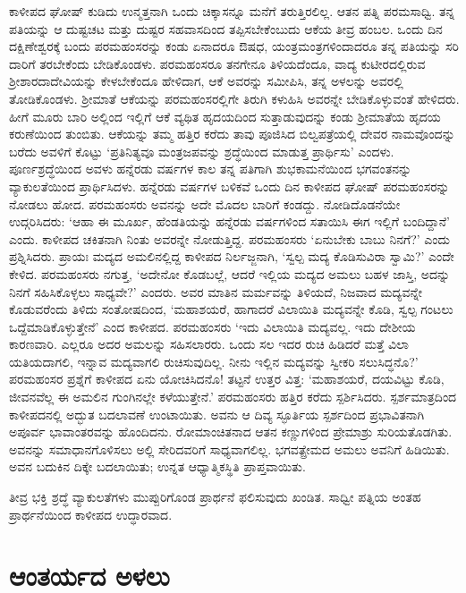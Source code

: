 ಕಾಳೀಪದ ಘೋಷ್ ಕುಡಿದು ಉನ್ಮತ್ತನಾಗಿ ಒಂದು ಚಿಕ್ಕಾಸನ್ನೂ ಮನೆಗೆ ತರುತ್ತಿರಲಿಲ್ಲ. ಆತನ ಪತ್ನಿ ಪರಮಸಾಧ್ವಿ. ತನ್ನ ಪತಿಯನ್ನು ಆ ದುಷ್ಟಚಟ ಮತ್ತು ದುಷ್ಟರ ಸಹವಾಸದಿಂದ ತಪ್ಪಿಸಬೇಕೆಂಬುದು ಆಕೆಯ ತೀವ್ರ ಹಂಬಲ. ಒಂದು ದಿನ ದಕ್ಷಿಣೇಶ್ವರಕ್ಕೆ ಬಂದು ಪರಮಹಂಸರನ್ನು ಕಂಡು ಏನಾದರೂ ಔಷಧ, ಯಂತ್ರಮಂತ್ರಗಳಿಂದಾದರೂ ತನ್ನ ಪತಿಯನ್ನು ಸರಿ ದಾರಿಗೆ ತರಬೇಕೆಂದು ಬೇಡಿಕೊಂಡಳು. ಪರಮಹಂಸರೂ ತನಗೇನೂ ತಿಳಿಯದೆಂದೂ, ವಾದ್ಯ ಕುಟೀರದಲ್ಲಿರುವ ಶ‍್ರೀಶಾರದಾದೇವಿಯನ್ನು ಕೇಳಬೇಕೆಂದೂ ಹೇಳಿದಾಗ, ಆಕೆ ಅವರನ್ನು ಸಮೀಪಿಸಿ, ತನ್ನ ಅಳಲನ್ನು ಅವರಲ್ಲಿ ತೋಡಿಕೊಂಡಳು. ಶ‍್ರೀಮಾತೆ ಆಕೆಯನ್ನು ಪರಮಹಂಸರಲ್ಲಿಗೇ ತಿರುಗಿ ಕಳುಹಿಸಿ ಅವರನ್ನೇ ಬೇಡಿಕೊಳ್ಳುವಂತೆ ಹೇಳಿದರು. ಹೀಗೆ ಮೂರು ಬಾರಿ ಅಲ್ಲಿಂದ ಇಲ್ಲಿಗೆ ಆಕೆ ವ್ಯಥಿತ ಹೃದಯದಿಂದ ಸುತ್ತಾಡುವುದನ್ನು ಕಂಡು ಶ‍್ರೀಮಾತೆಯ ಹೃದಯ ಕರುಣೆಯಿಂದ ತುಂಬಿತು. ಆಕೆಯನ್ನು ತಮ್ಮ ಹತ್ತಿರ ಕರೆದು ತಾವು ಪೂಜಿಸಿದ ಬಿಲ್ವಪತ್ರೆಯಲ್ಲಿ ದೇವರ ನಾಮವೊಂದನ್ನು ಬರೆದು ಅವಳಿಗೆ ಕೊಟ್ಟು ‘ಪ್ರತಿನಿತ್ಯವೂ ಮಂತ್ರಜಪವನ್ನು ಶ್ರದ್ಧೆಯಿಂದ ಮಾಡುತ್ತ ಪ್ರಾರ್ಥಿಸು’ ಎಂದಳು. ಪೂರ್ಣಶ್ರದ್ಧೆಯಿಂದ ಅವಳು ಹನ್ನೆರಡು ವರ್ಷಗಳ ಕಾಲ ತನ್ನ ಪತಿಗಾಗಿ ಶುಭಕಾಮನೆಯಿಂದ ಭಗವಂತನನ್ನು ವ್ಯಾಕುಲತೆಯಿಂದ ಪ್ರಾರ್ಥಿಸಿದಳು. ಹನ್ನೆರಡು ವರ್ಷಗಳ ಬಳಿಕವೆ ಒಂದು ದಿನ ಕಾಳೀಪದ ಘೋಷ್ ಪರಮಹಂಸರನ್ನು ನೋಡಲು ಹೋದ. ಪರಮಹಂಸರು ಅವನನ್ನು ಅದೇ ಮೊದಲ ಬಾರಿಗೆ ಕಂಡದ್ದು. ನೋಡಿದೊಡನೆಯೇ ಉದ್ಗರಿಸಿದರು: ‘ಆಹಾ ಈ ಮೂರ್ಖ, ಹೆಂಡತಿಯನ್ನು ಹನ್ನೆರಡು ವರ್ಷಗಳಿಂದ ಸತಾಯಿಸಿ ಈಗ ಇಲ್ಲಿಗೆ ಬಂದಿದ್ದಾನೆ’ ಎಂದು. ಕಾಳೀಪದ ಚಕಿತನಾಗಿ ನಿಂತು ಅವರನ್ನೇ ನೋಡುತ್ತಿದ್ದ. ಪರಮಹಂಸರು ‘ಏನುಬೇಕು ಬಾಬು ನಿನಗೆ?’ ಎಂದು ಪ್ರಶ್ನಿಸಿದರು. ಪ್ರಾಯಃ ಮದ್ಯದ ಅಮಲಿನಲ್ಲಿದ್ದ ಕಾಳೀಪದ ನಿರ್ಲಜ್ಜನಾಗಿ, ‘ಸ್ವಲ್ಪ ಮದ್ಯ ಕೊಡಿಸುವಿರಾ ಸ್ವಾಮಿ?’ ಎಂದೇ ಕೇಳಿದ. ಪರಮಹಂಸರು ನಗುತ್ತ, ‘ಅದೇನೋ ಕೊಡಬಲ್ಲೆ, ಆದರೆ ಇಲ್ಲಿಯ ಮದ್ಯದ ಅಮಲು ಬಹಳ ಜಾಸ್ತಿ, ಅದನ್ನು ನಿನಗೆ ಸಹಿಸಿಕೊಳ್ಳಲು ಸಾಧ್ಯವೇ?’ ಎಂದರು. ಅವರ ಮಾತಿನ ಮರ್ಮವನ್ನು ತಿಳಿಯದೆ, ನಿಜವಾದ ಮದ್ಯವನ್ನೇ ಕೊಡುವರೆಂದು ತಿಳಿದು ಸಂತೋಷದಿಂದ, ‘ಮಹಾಶಯರೆ, ಹಾಗಾದರೆ ವಿಲಾಯಿತಿ ಮದ್ಯವನ್ನೇ ಕೊಡಿ, ಸ್ವಲ್ಪ ಗಂಟಲು ಒದ್ದೆಮಾಡಿಕೊಳ್ಳುತ್ತೇನೆ’ ಎಂದ ಕಾಳೀಪದ. ಪರಮಹಂಸರು ‘ಇದು ವಿಲಾಯಿತಿ ಮದ್ಯವಲ್ಲ. ಇದು ದೇಶೀಯ ಕಾರಣವಾರಿ. ಎಲ್ಲರೂ ಅದರ ಅಮಲನ್ನು ಸಹಿಸಲಾರರು. ಒಂದು ಸಲ ಇದರ ರುಚಿ ಹಿಡಿದರೆ ಮತ್ತೆ ವಿಲಾ ಯತಿಯದಾಗಲಿ, ಇನ್ನಾವ ಮದ್ಯವಾಗಲಿ ರುಚಿಸುವುದಿಲ್ಲ. ನೀನು ಇಲ್ಲಿನ ಮದ್ಯವನ್ನು ಸ್ವೀಕರಿ ಸಲುಸಿದ್ಧನೊ?’ ಪರಮಹಂಸರ ಪ್ರಶ್ನೆಗೆ ಕಾಳೀಪದ ಏನು ಯೋಚಿಸಿದನೊ! ತಟ್ಟನೆ ಉತ್ತರ ವಿತ್ತ: ‘ಮಹಾಶಯರೆ, ದಯವಿಟ್ಟು ಕೊಡಿ, ಜೀವನವೆಲ್ಲ ಈ ಅಮಲಿನ ಗುಂಗಿನಲ್ಲೇ ಕಳೆಯುತ್ತೇನೆ.’ ಪರಮಹಂಸರು ಹತ್ತಿರ ಕರೆದು ಸ್ಪರ್ಶಿಸಿದರು. ಸ್ಪರ್ಶಮಾತ್ರದಿಂದ ಕಾಳೀಪದನಲ್ಲಿ ಅದ್ಭುತ ಬದಲಾವಣೆ ಉಂಟಾಯಿತು. ಅವನು ಆ ದಿವ್ಯ ಸ್ಫೂರ್ತಿಯ ಸ್ಪರ್ಶದಿಂದ ಪ್ರಭಾವಿತನಾಗಿ ಅಪೂರ್ವ ಭಾವಾಂತರವನ್ನು ಹೊಂದಿದನು. ರೋಮಾಂಚಿತನಾದ ಆತನ ಕಣ್ಣುಗಳಿಂದ ಪ್ರೇಮಾಶ್ರು ಸುರಿಯತೊಡಗಿತು. ಅವನನ್ನು ಸಮಾಧಾನಗೊಳಿಸಲು ಅಲ್ಲಿ ಸೇರಿದವರಿಗೆ ಸಾಧ್ಯವಾಗಲಿಲ್ಲ. ಭಗವತ್ಪ್ರೇಮದ ಅಮಲು ಅವನಿಗೆ ಹಿಡಿಯಿತು. ಅವನ ಬದುಕಿನ ದಿಕ್ಕೇ ಬದಲಾಯಿತು; ಉನ್ನತ ಆಧ್ಯಾತ್ಮಿಕಸ್ಥಿತಿ ಪ್ರಾಪ್ತ\-ವಾಯಿತು.

ತೀವ್ರ ಭಕ್ತಿ ಶ್ರದ್ಧೆ ವ್ಯಾಕುಲತೆಗಳು ಮುಪ್ಪುರಿಗೊಂಡ ಪ್ರಾರ್ಥನೆ ಫಲಿಸುವುದು ಖಂಡಿತ. ಸಾಧ್ವೀ ಪತ್ನಿಯ ಅಂತಹ ಪ್ರಾರ್ಥನೆಯಿಂದ ಕಾಳೀಪದ ಉದ್ಧಾರವಾದ.


\section*{ಆಂತರ್ಯದ ಅಳಲು}

